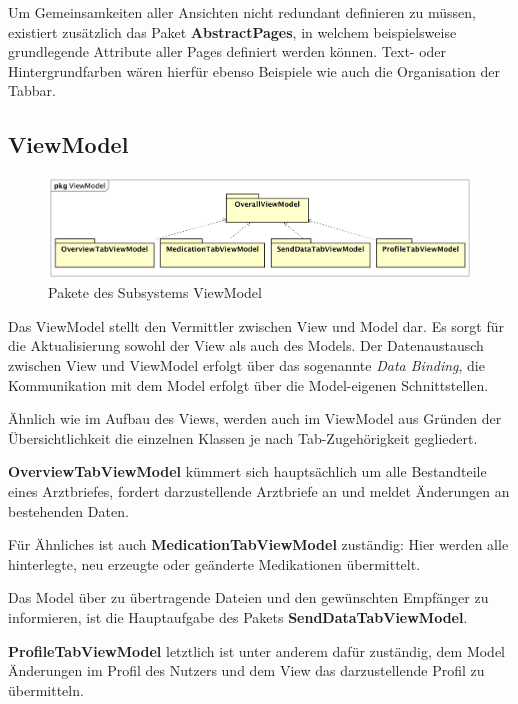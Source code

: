 \documentclass[a4paper]{scrreprt}
\begin{document}
Um Gemeinsamkeiten aller Ansichten nicht redundant definieren zu müssen, existiert zusätzlich das Paket \textbf{AbstractPages}, in welchem beispielsweise grundlegende Attribute aller Pages definiert werden können. Text- oder Hintergrundfarben wären hierfür ebenso Beispiele wie auch die Organisation der Tabbar.

\subsection{ViewModel}
\begin{figure}[H]
\centering
\includegraphics[width=0.75\textheight]{graphics/Klassendiagramme/ViewModel/ViewModelLayout.png}
\caption{Pakete des Subsystems ViewModel}
\end{figure}
Das ViewModel stellt den Vermittler zwischen View und Model dar. Es sorgt für die Aktualisierung sowohl der View als auch des Models. Der Datenaustausch zwischen View und ViewModel erfolgt über das sogenannte \textit{Data Binding}, die Kommunikation mit dem Model erfolgt über die Model-eigenen Schnittstellen.

Ähnlich wie im Aufbau des Views, werden auch im ViewModel aus Gründen der Übersichtlichkeit die einzelnen Klassen je nach Tab-Zugehörigkeit gegliedert.

\textbf{OverviewTabViewModel} kümmert sich hauptsächlich um alle Bestandteile eines Arztbriefes, fordert darzustellende Arztbriefe an und meldet Änderungen an bestehenden Daten.

Für Ähnliches ist auch \textbf{MedicationTabViewModel} zuständig: Hier werden alle hinterlegte, neu erzeugte oder geänderte Medikationen übermittelt.

Das Model über zu übertragende Dateien und den gewünschten Empfänger zu informieren, ist die Hauptaufgabe des Pakets \textbf{SendDataTabViewModel}.

\textbf{ProfileTabViewModel} letztlich ist unter anderem dafür zuständig, dem Model Änderungen im Profil des Nutzers und dem View das darzustellende Profil zu übermitteln.
\end{document}
